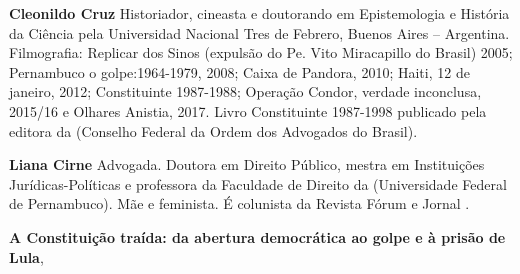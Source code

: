 \textbf{Cleonildo Cruz} Historiador, cineasta e doutorando em Epistemologia e História da Ciência pela Universidad Nacional Tres de Febrero, Buenos Aires – Argentina. Filmografia: Replicar dos Sinos (expulsão do Pe. Vito Miracapillo do Brasil) 2005; Pernambuco o golpe:1964-1979, 2008; Caixa de Pandora, 2010; Haiti, 12 de janeiro, 2012; Constituinte 1987-1988; Operação Condor, verdade inconclusa, 2015/16 e Olhares Anistia, 2017. Livro Constituinte 1987-1998 publicado pela editora da  (Conselho Federal da Ordem dos Advogados do Brasil).

\textbf{Liana Cirne} Advogada. Doutora em Direito Público, mestra em Instituições Jurídicas-Políticas e professora da Faculdade de Direito da  (Universidade Federal de Pernambuco). Mãe e feminista. É colunista da Revista Fórum e Jornal . 

\textbf{A Constituição traída: da abertura democrática ao golpe e à prisão de Lula}, \lipsum[3]\par






